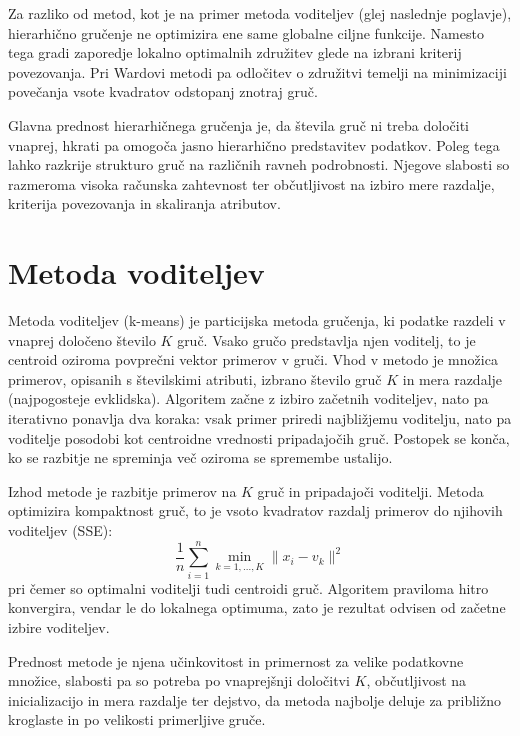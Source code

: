 Za razliko od metod, kot je na primer metoda voditeljev (glej naslednje poglavje), hierarhično gručenje ne optimizira ene same globalne ciljne funkcije. Namesto tega gradi zaporedje lokalno optimalnih združitev glede na izbrani kriterij povezovanja. Pri Wardovi metodi pa odločitev o združitvi temelji na minimizaciji povečanja vsote kvadratov odstopanj znotraj gruč.

Glavna prednost hierarhičnega gručenja je, da števila gruč ni treba določiti vnaprej, hkrati pa omogoča jasno hierarhično predstavitev podatkov. Poleg tega lahko razkrije strukturo gruč na različnih ravneh podrobnosti. Njegove slabosti so razmeroma visoka računska zahtevnost ter občutljivost na izbiro mere razdalje, kriterija povezovanja in skaliranja atributov.

\section{Metoda voditeljev}
Metoda voditeljev (k-means) 
%
%
je particijska metoda gručenja, ki podatke razdeli v vnaprej določeno število $K$ gruč. Vsako gručo predstavlja njen voditelj, to je centroid oziroma povprečni vektor primerov v gruči. Vhod v metodo je množica primerov, opisanih s številskimi atributi, izbrano število gruč $K$ in mera razdalje (najpogosteje evklidska). Algoritem začne z izbiro začetnih voditeljev, nato pa iterativno ponavlja dva koraka: vsak primer priredi najbližjemu voditelju, nato pa voditelje posodobi kot centroidne vrednosti pripadajočih gruč. Postopek se konča, ko se razbitje ne spreminja več oziroma se spremembe ustalijo.

Izhod metode je razbitje primerov na $K$ gruč in pripadajoči voditelji. Metoda optimizira kompaktnost gruč, to je vsoto kvadratov razdalj primerov do njihovih voditeljev (SSE):
\[
\frac{1}{n}\sum_{i=1}^n \min_{k=1,\ldots,K}\|x_i-v_k\|^2 
\]
pri čemer so optimalni voditelji tudi centroidi gruč. Algoritem praviloma hitro konvergira, vendar le do lokalnega optimuma, zato je rezultat odvisen od začetne izbire voditeljev.

Prednost metode je njena učinkovitost in primernost za velike podatkovne množice, slabosti pa so potreba po vnaprejšnji določitvi $K$, občutljivost na inicializacijo in mera razdalje ter dejstvo, da metoda najbolje deluje za približno kroglaste in po velikosti primerljive gruče.

